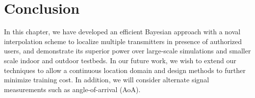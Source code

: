 \section{Conclusion}

In this chapter, we have developed an efficient Bayesian approach with a noval interpolation scheme to
localize multiple transmitters in presence of authorized users, and
demonstrate its superior power over large-scale simulations and smaller
scale indoor and outdoor testbeds.
In our future work, we wish to extend our techniques to allow a
continuous location domain and design methods to further minimize
training cost. In addition, we will consider alternate signal
measurements such as angle-of-arrival (AoA).




